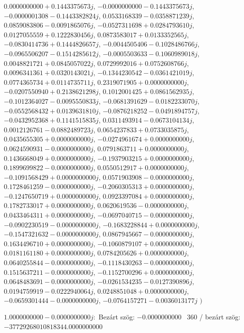 \documentclass[14pt,a4paper]{article}
\begin{document}
\begin{itemize}
$0.0000000000+0.1443375673j$, $-0.0000000000-0.1443375673j$, $-0.0000001308-0.1443382824j$, $0.0533168339-0.0358871239j$, $0.0859083806-0.0091865076j$, $-0.0527311698+0.0284793610j$, $0.0127055559+0.1222830456j$, $0.0873583017+0.0133352565j$, $-0.0830414736+0.1444826657j$, $-0.0044505406-0.1028486766j$, $-0.0965506207-0.1514285612j$, $-0.0005503633-0.1060989018j$, $0.0048821721+0.0845057022j$, $0.0729992016+0.0752608766j$, $0.0096341361+0.0320143021j$, $-0.1344230542-0.0361421019j$, $0.0774365734+0.0114735711j$, $0.2319071905+0.0000000000j$, $-0.0207550940+0.2138621298j$, $0.1012001425+0.0861562935j$, $-0.1012364027-0.0095550833j$, $-0.0681391629-0.0182233070j$, $-0.0552568432+0.0139631810j$, $-0.0876218252-0.0491894757j$, $-0.0432952368+0.1141515835j$, $0.0311493914-0.0673104134j$, $0.0012126761-0.0882489723j$, $0.0654237833+0.0733035875j$, $0.0435655305+0.0000000000j$, $-0.0274961674+0.0000000000j$, $0.0624590931-0.0000000000j$, $0.0791863711+0.0000000000j$, $0.1436668049+0.0000000000j$, $-0.1937903215+0.0000000000j$, $0.1899699822-0.0000000000j$, $0.0550512917+0.0000000000j$, $-0.1091568429+0.0000000000j$, $0.0571903908-0.0000000000j$, $0.1728461259-0.0000000000j$, $-0.2060305313+0.0000000000j$, $-0.1247650719+0.0000000000j$, $0.0923397084+0.0000000000j$, $0.1782733017+0.0000000000j$, $0.0620619536-0.0000000000j$, $0.0433464311+0.0000000000j$, $-0.0697040715-0.0000000000j$, $-0.0902230519-0.0000000000j$, $-0.1683228844+0.0000000000j$, $-0.1547321632-0.0000000000j$, $0.0867945667-0.0000000000j$, $0.1634496710+0.0000000000j$, $-0.1060879107+0.0000000000j$, $0.0181161180+0.0000000000j$, $0.0784205626+0.0000000000j$, $0.0640255844-0.0000000000j$, $-0.1118430263-0.0000000000j$, $0.1515637211-0.0000000000j$, $-0.1152700296+0.0000000000j$, $0.0648483691-0.0000000000j$, $-0.0261534235-0.0127390896j$, $0.0194759919-0.0222940064j$, $0.0248851048+0.0000000000j$, $-0.0659301444-0.0000000000j$, $-0.0764157271-0.0036013177j$
$\big)$
\end{itemize}
$1.0000000000-0.0000000000j$:\
Bezárt szög: $-0.0000000000$ \
360 / bezárt szög: $-37729268010818344.0000000000$\
\end{document}
